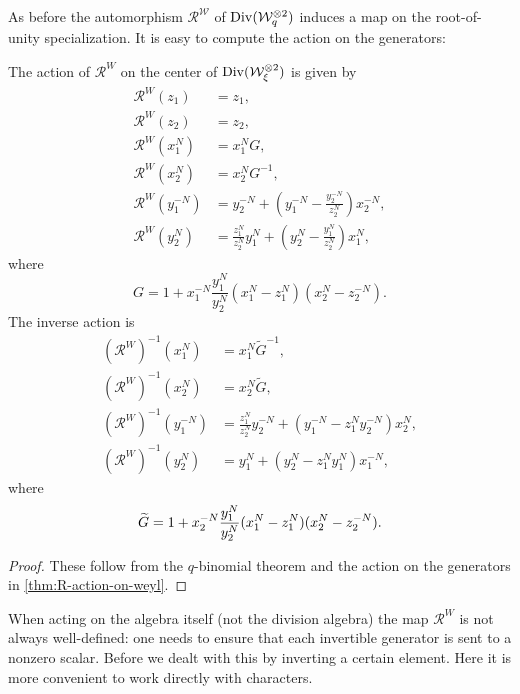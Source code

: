 \documentclass{sl2ams}
\numberwithin{equation}{section}
\newcommand{\W}{\mathcal{W}}
\newcommand{\R}{\mathcal{R}}
\begin{document}
As before the automorphism \(\R^\W\)  of \(\Div(\W_q^{\otimes 2})\) induces a map on the root-of-unity specialization.
It is easy to compute the action on the generators:

\begin{proposition}
  \label{prop:RW-action-on-center}
  The action of $\R^W$ on the center of $\Div(\W_\xi^{\otimes 2})$ is given by
  \begin{align*}
    \R^W(z_1)&=z_1, \\
    \R^W(z_2)&=z_2, \\
    \R^W(x_1^N)&=x_1^N G , \\
    \R^W(x_2^N)&=x_2^N G^{-1}, \\
    \R^W(y_1^{-N})&= y_2^{-N}+\left(y_1^{-N} - \frac{y_2^{-N}}{z_2^{N}}\right)x_2^{-N}, \\
    \R^W(y_2^N)&=\frac{z_1^N}{z_2^{N}}y_1^{N}+ \left(y_2^N - \frac{y_1^N}{z_2^N}\right)x_1^N,
  \end{align*}
  where
  \begin{equation*}
    G = 1 + x_1^{-N} \frac{y_1^N}{y_2^N}(x_1^N - z_1^N)(x_2^N - z_2^{-N}).
  \end{equation*}
  The inverse action is
  \begin{align*}
    (\R^W)^{-1}(x_1^N)&= x_1^N \widetilde G^{-1}, \\
    (\R^W)^{-1}(x_2^N)&= x_2^N \widetilde G, \\
    (\R^W)^{-1}(y_1^{-N})&= \frac{z_1^N}{z_2^N}y_2^{-N}+(y_1^{-N} - z_1^N y_2^{-N})x_2^{N} ,  \\
    (\R^W)^{-1}(y_2^{N})&=y_1^{N}+(y_2^N - z_1^N y_1^N)x_1^{-N},
  \end{align*}
  where
  \begin{equation*}
    \widetilde{G} = 1 + x_2^{-N} \frac{y_1^N}{y_2^N} (x_1^N - z_1^N)(x_2^N - z_2^{-N}).
    \qedhere
  \end{equation*}
\end{proposition}

\begin{proof}
  These follow from the $q$-binomial theorem and the action on the generators in \cref{thm:R-action-on-weyl}.
\end{proof}

When acting on the algebra itself (not the division algebra) the map \(\R^{W}\) is not always well-defined: one needs to ensure that each invertible generator is sent to a nonzero scalar.
Before we dealt with this by inverting a certain element.
Here it is more convenient to work directly with characters.
\end{document}
